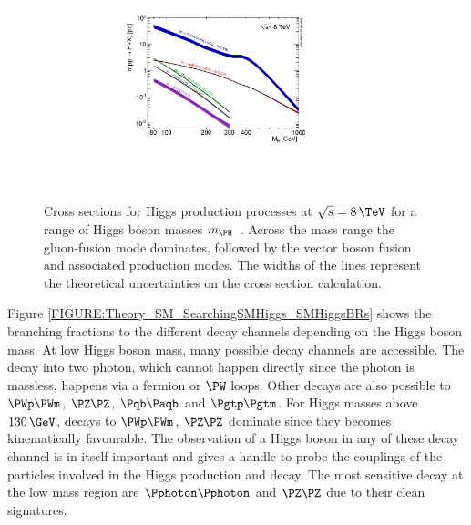 \begin{figure}[!htb]
 \includegraphics[width=0.7\textwidth]{Chapter01/Images/Higgs_XS_8TeV_lx.pdf}
\caption[Cross sections for Higgs production processes at $\sqrt{s}=8\,\TeV$ for
a range of Higgs boson masses.]{Cross sections for Higgs production processes at
$\sqrt{s}=8\,\TeV$ for a range of Higgs boson masses $m_{\PH}$~\cite{ARTICLE:HandbookofLHCHiggsCrossSectionsHiggsProperties}. Across the
mass range the gluon-fusion mode dominates, followed by the vector boson fusion
and associated production modes. The widths of the lines represent the
theoretical uncertainties on the cross section calculation.}
\label{FIGURE:Theory_SM_SearchingSMHiggs_SMHiggsXS}
\end{figure}

Figure \ref{FIGURE:Theory_SM_SearchingSMHiggs_SMHiggsBRs} shows the branching fractions to the different decay channels depending on the Higgs boson mass. At low Higgs boson mass, many possible decay channels are accessible. The decay into two photon, which cannot happen directly since the photon is massless, happens via a fermion or $\PW$ loops. Other decays are also possible to $\PWp\PWm$, $\PZ\PZ$, $\Pqb\Paqb$ and $\Pgtp\Pgtm$. For Higgs masses above $130\,\GeV$, decays to $\PWp\PWm$, $\PZ\PZ$ dominate since they becomes kinematically favourable. The observation of a Higgs boson in any of these decay channel is in itself important and gives a handle to probe the couplings of the particles involved in the Higgs production and decay. The most sensitive decay at the low mass region are $\Pphoton\Pphoton$ and $\PZ\PZ$ due to their clean signatures.

